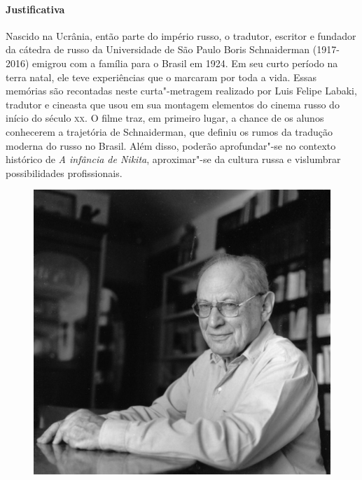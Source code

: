 \documentclass{article}
\begin{document}
\paragraph{Justificativa}
Nascido na Ucrânia, então parte do império russo, o tradutor, escritor e
fundador da cátedra de russo da Universidade de São Paulo Boris
Schnaiderman (1917-2016) emigrou com a família para o Brasil em 1924. Em
seu curto período na terra natal, ele teve experiências que o marcaram
por toda a vida. Essas memórias são recontadas neste curta"-metragem
realizado por Luis Felipe Labaki, tradutor e cineasta que usou em sua
montagem elementos do cinema russo do início do século \textsc{xx}. O filme traz,
em primeiro lugar, a chance de os alunos conhecerem a trajetória de
Schnaiderman, que definiu os rumos da tradução moderna do russo no
Brasil. Além disso, poderão aprofundar"-se no contexto histórico de
\emph{A infância de Nikita}, aproximar"-se da cultura russa e vislumbrar
possibilidades profissionais.

\begin{figure}[ht!]
\includegraphics[width=\textwidth]{./images/PNLD0049-14.png}
\end{figure}
\end{document}
